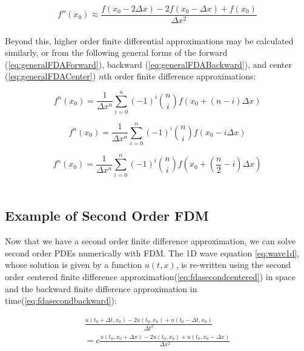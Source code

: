{        \begin{equation}
f''(x_{0}) \approx \frac{f(x_{0} - 2\Delta  x) - 2f(x_{0} - \Delta  x) + f(x_{0})}{\Delta  x^{2}}
  \end{equation}
  \\
 Beyond this, higher order finite differential approximations may be calculated similarly, or from the following general forms of the forward (\ref{eq:generalFDAForward}), backward (\ref{eq:generalFDABackward}), and center (\ref{eq:generalFDACenter}) $n$th order finite difference approximations:
 
  \begin{equation}\label{eq:generalFDAForward}
 f^{n}(x_{0}) = \frac{1}{\Delta  x^{n}}\sum_{i=0}^{n}(-1)^{i}\binom {n} {i}f(x_{0} + (n-i)\Delta  x)
 \end{equation}
 
 \begin{equation}\label{eq:generalFDABackward}
 f^{n}(x_{0}) = \frac{1}{\Delta  x^{n}}\sum_{i=0}^{n}(-1)^{i}\binom {n} {i}f(x_{0} - i\Delta  x)
 \end{equation}
 
  \begin{equation}\label{eq:generalFDACenter}
 f^{n}(x_{0}) = \frac{1}{\Delta  x^{n}}\sum_{i=0}^{n}(-1)^{i}\binom {n} {i}f(x_{0} + \left(\frac{n}{2}-i\right)\Delta  x)
 \end{equation}
 \\
\subsection{Example of Second Order FDM}

Now that we have a second order finite difference approximation, we can solve second order PDEs numerically with FDM.  The 1D wave equation \ref{eq:wave1d}, whose solution is given by a function $u(t, x)$, is re-written using the second order centered finite difference approximation(\ref{eq:fdasecondcentered}) in space and the backward finite difference approximation in time(\ref{eq:fdasecondbackward}):

 \begin{equation}
 \begin{split}
  \frac{u(t_{0} + \Delta  t, x_{0}) - 2u(t_{0}, x_{0}) +u(t_{0} - \Delta  t, x_{0})}{\Delta  t^{2}}\\
 = c  \frac{u(t_0, x_{0} + \Delta  x) - 2u(t_0, x_{0}) +u(t_0, x_{0} - \Delta  x) }{\Delta  x^{2}}
 \end{split}
  \end{equation}

}
